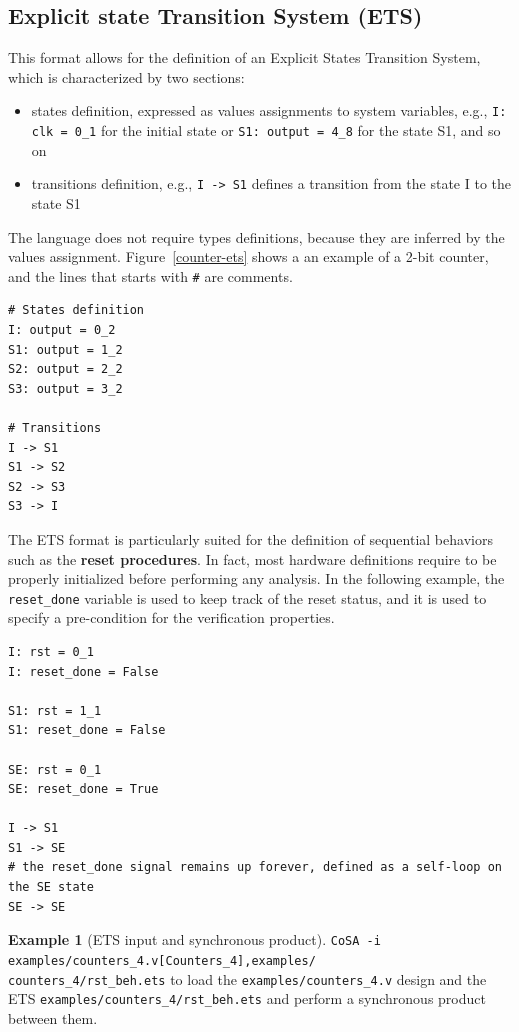 \documentclass{article}
\theoremstyle{definition}
\newtheorem{example}{Example}[section]
\begin{document}
\subsection{Explicit state Transition System (ETS)}

This format allows for the definition of an Explicit States Transition System, which is characterized by two sections:
\begin{itemize}
\item states definition, expressed as values assignments to system
  variables, e.g., \texttt{I: clk = 0\_1} for the initial state or
  \texttt{S1: output = 4\_8} for the state S1, and so on
\item transitions definition, e.g., \texttt{I -> S1} defines a
  transition from the state I to the state S1
\end{itemize}

The language does not require types definitions, because they are
inferred by the values assignment. Figure~\ref{counter-ets} shows a an
example of a 2-bit counter, and the lines that starts with \texttt{\#}
are comments.

\begin{lstlisting}[frame=single,language=ets,caption=2-bit Counter,label=counter-ets]
# States definition
I: output = 0_2
S1: output = 1_2
S2: output = 2_2
S3: output = 3_2

# Transitions
I -> S1
S1 -> S2
S2 -> S3
S3 -> I
\end{lstlisting}

The ETS format is particularly suited for the definition of sequential
behaviors such as the \textbf{reset procedures}. In fact, most
hardware definitions require to be properly initialized before
performing any analysis. In the following example, the
\texttt{reset\_done} variable is used to keep track of the reset
status, and it is used to specify a pre-condition for the verification
properties.

\begin{lstlisting}[frame=single,language=ets,caption=Reset procedure example,label=reset]
I: rst = 0_1
I: reset_done = False

S1: rst = 1_1
S1: reset_done = False

SE: rst = 0_1
SE: reset_done = True

I -> S1
S1 -> SE
# the reset_done signal remains up forever, defined as a self-loop on the SE state
SE -> SE
\end{lstlisting}

\begin{example}[ETS input and synchronous product]
  \texttt{CoSA -i
    examples/counters\_4.v[Counters\_4],examples/\\counters\_4/rst\_beh.ets}
  to load the \texttt{examples/counters\_4.v} design and the ETS
  \texttt{examples/counters\_4/rst\_beh.ets} and perform a synchronous
  product between them.
\end{example}
\end{document}
